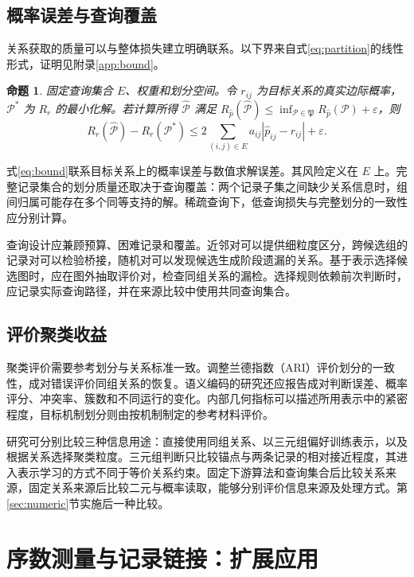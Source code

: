 \documentclass[UTF8,a4paper,zihao=-4,fontset=fandol]{ctexart}
\newtheorem{proposition}{命题}
\begin{document}
\subsection{概率误差与查询覆盖}

关系获取的质量可以与整体损失建立明确联系。以下界来自式\eqref{eq:partition}的线性形式，证明见附录\ref{app:bound}。

\begin{proposition}\label{prop:bound}
固定查询集合 $E$、权重和划分空间。令 $r_{ij}$ 为目标关系的真实边际概率，$\mathcal P^*$ 为 $R_r$ 的最小化解。若计算所得 $\widehat{\mathcal P}$ 满足
$R_{\widehat p}(\widehat{\mathcal P})\leq\inf_{\mathcal P\in\mathfrak P}R_{\widehat p}(\mathcal P)+\varepsilon$，则
\begin{equation}
 R_r(\widehat{\mathcal P})-R_r(\mathcal P^*)
 \leq 2\sum_{(i,j)\in E}a_{ij}|\widehat p_{ij}-r_{ij}|+\varepsilon.
 \label{eq:bound}
\end{equation}
\end{proposition}

式\eqref{eq:bound}联系目标关系上的概率误差与数值求解误差。其风险定义在 $E$ 上。完整记录集合的划分质量还取决于查询覆盖：两个记录子集之间缺少关系信息时，组间归属可能存在多个同等支持的解。稀疏查询下，低查询损失与完整划分的一致性应分别计算。

查询设计应兼顾预算、困难记录和覆盖。近邻对可以提供细粒度区分，跨候选组的记录对可以检验桥接，随机对可以发现候选生成阶段遗漏的关系。基于表示选择候选图时，应在图外抽取评价对，检查同组关系的漏检。选择规则依赖前次判断时，应记录实际查询路径，并在来源比较中使用共同查询集合。

\subsection{评价聚类收益}

聚类评价需要参考划分与关系标准一致。调整兰德指数（ARI）评价划分的一致性，成对错误评价同组关系的恢复\citep{hubert1985}。语义编码的研究还应报告成对判断误差、概率评分、冲突率、簇数和不同运行的变化。内部几何指标可以描述所用表示中的紧密程度，目标机制划分则由按机制制定的参考材料评价。

研究可分别比较三种信息用途：直接使用同组关系、以三元组偏好训练表示，以及根据关系选择聚类粒度。三元组判断只比较锚点与两条记录的相对接近程度，其进入表示学习的方式不同于等价关系约束。固定下游算法和查询集合后比较关系来源，固定关系来源后比较二元与概率读取，能够分别评价信息来源及处理方式。第\ref{sec:numeric}节实施后一种比较。

\section{序数测量与记录链接：扩展应用}\label{sec:extensions}
\end{document}
